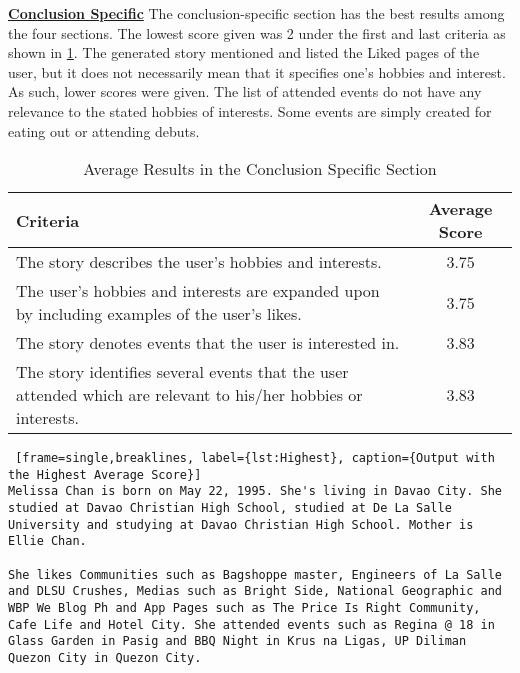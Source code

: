 \underline{\textbf{Conclusion Specific}}
The conclusion-specific section has the best results among the four sections. The lowest score given was 2 under the first and last criteria as shown in \ref{tab:criteria4}. The generated story mentioned and listed the Liked pages of the user, but it does not necessarily mean that it specifies one's hobbies and interest. As such, lower scores were given. The list of attended events do not have any relevance to the stated hobbies of interests. Some events are simply created for eating out or attending debuts.

\begin{table}[ph!]   %
	\centering
	\caption{Average Results in the Conclusion Specific Section} \vspace{0.25em}
	\begin{tabular}{|p{2.5in}|c|} \hline
		\centering Criteria & Average Score \\ \hline
		The story describes the user’s hobbies and interests. & 3.75 \\ \hline
		The user’s hobbies and interests are expanded upon by including examples of the user’s likes. & 3.75 \\ \hline
		The story denotes events that the user is interested in. & 3.83 \\ \hline
		The story identifies several events that the user attended which are relevant to his/her hobbies or interests. & 3.83 \\ \hline
	\end{tabular}
	\label{tab:criteria4}
\end{table}

\begin{lstlisting} [frame=single,breaklines, label={lst:Highest}, caption={Output with the Highest Average Score}]
Melissa Chan is born on May 22, 1995. She's living in Davao City. She studied at Davao Christian High School, studied at De La Salle University and studying at Davao Christian High School. Mother is Ellie Chan.
 
She likes Communities such as Bagshoppe master, Engineers of La Salle and DLSU Crushes, Medias such as Bright Side, National Geographic and WBP We Blog Ph and App Pages such as The Price Is Right Community, Cafe Life and Hotel City. She attended events such as Regina @ 18 in Glass Garden in Pasig and BBQ Night in Krus na Ligas, UP Diliman Quezon City in Quezon City.
\end{lstlisting}

